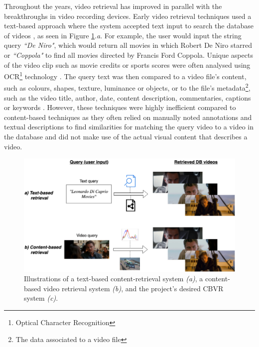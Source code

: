Throughout the years, video retrieval has improved in parallel with the breakthroughs in video recording devices. Early video retrieval techniques used a text-based approach where the system accepted text input to search the database of videos \cite{lai2015trajectory}, as seen in Figure \ref{fig:text_vs_content_retrieval}.\emph{a}. For example, the user would input the string query \textit{``De Niro"}, which would return all movies in which Robert De Niro starred or \textit{``Coppola"} to find all movies directed by Francis Ford Coppola. Unique aspects of the video clip such as movie credits or sports scores were often analysed using OCR\footnote{Optical Character Recognition} technology \cite{li2002text}. The query text was then compared to a video file's content, such as colours, shapes, texture, luminance or objects, or to the file's metadata\footnote{The data associated to a video file}, such as the video title, author, date, content description, commentaries, captions or keywords \cite{li2002text} \cite{feng2011} \cite{patel2012}. However, these techniques were highly inefficient compared to content-based techniques as they often relied on manually noted annotations and textual descriptions to find similarities for matching the query video to a video in the database and did not make use of the actual visual content that describes a video.\\

\begin{figure}[h]
\centerline{\includegraphics[width=\textwidth]{figures/content_text-retrieval_comparison.png}}
\caption{\label{fig:text_vs_content_retrieval}Illustrations of a text-based content-retrieval system \emph{(a)}, a content-based video retrieval system \emph{(b)}, and the project's desired CBVR system \emph{(c)}.}
\end{figure}

